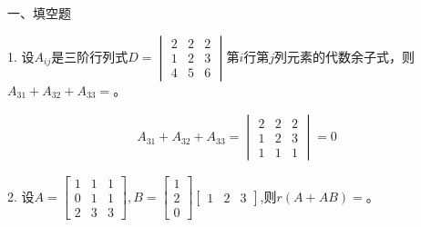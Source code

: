 \documentclass{article}
\begin{document}
一、填空题

1. 设$A_{ij}$是三阶行列式$
D=
\begin{vmatrix}
  2 & 2 & 2\\
  1 & 2 & 3\\
  4 & 5 & 6
\end{vmatrix}
$第$i$行第$j$列元素的代数余子式，则$A_{31}+A_{32}+A_{33}=$\underline{\hphantom{~~~~~~~~~~}}。

\begin{jie}
\begin{align*}
A_ {31}+A_{32}+A_{33}=\begin{vmatrix}
  2 & 2 & 2\\
  1 & 2 & 3\\
  1 & 1 & 1
\end{vmatrix}=0
\end{align*}
\end{jie}

2. 设$
A=
\begin{bmatrix}
  1 & 1 & 1 \\
  0 & 1 & 1 \\
  2 & 3 & 3
\end{bmatrix},
B=\begin{bmatrix}
    1\\ 2\\ 0
  \end{bmatrix}
  \begin{bmatrix}
  1 & 2&3
  \end{bmatrix}
$,则$r(A+AB)=$\underline{\hphantom{~~~~~~~~~~}}。
\end{document}
